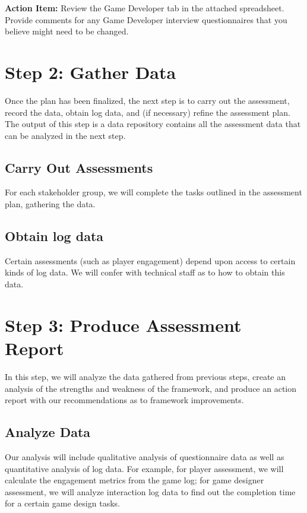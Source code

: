 \documentclass[11pt,oneside]{book}
\begin{document}
\begin{shadebox}
{\bf Action Item:} Review the Game Developer tab in the attached
spreadsheet.  Provide comments for any Game Developer interview questionnaires that
you believe might need to be changed. 
\end{shadebox}

\chapter{Step 2: Gather Data}

Once the plan has been finalized, the next step is to carry out the assessment, record the data, obtain log
data, and (if necessary) refine the assessment plan.  The output of this
step is a data repository contains all the assessment data that can be
analyzed in the next step.

\section{Carry Out Assessments}

For each stakeholder group, we will complete the tasks outlined in the
assessment plan, gathering the data.

\section{Obtain log data}

Certain assessments (such as player engagement) depend upon access to
certain kinds of log data.  We will confer with technical staff as to
how to obtain this data. 

\chapter{Step 3: Produce Assessment Report}

In this step, we will analyze the data gathered from previous steps,
create an analysis of the strengths and weakness of the framework, 
and produce an action report with our recommendations as to framework improvements.

\section{Analyze Data}

Our analysis will include qualitative analysis of questionnaire data
as well as quantitative analysis of log data. For example, for player
assessment, we will calculate the engagement metrics from the game
log; for game designer assessment, we will analyze interaction log
data to find out the completion time for a certain game design tasks.
\end{document}

